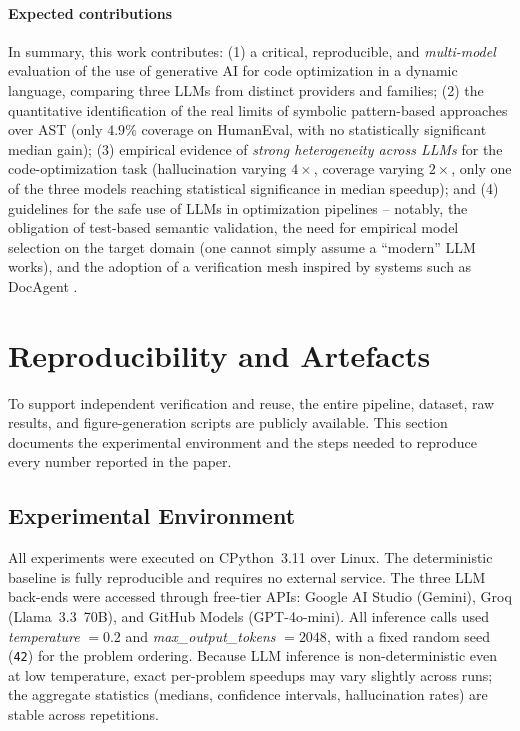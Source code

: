 \documentclass[conference]{IEEEtran}
\begin{document}
\paragraph{Expected contributions} In summary, this work contributes: (1) a critical, reproducible, and \emph{multi-model} evaluation of the use of generative AI for code optimization in a dynamic language, comparing three LLMs from distinct providers and families; (2) the quantitative identification of the real limits of symbolic pattern-based approaches over AST (only $4.9\%$ coverage on HumanEval, with no statistically significant median gain); (3) empirical evidence of \emph{strong heterogeneity across LLMs} for the code-optimization task (hallucination varying $4\times$, coverage varying $2\times$, only one of the three models reaching statistical significance in median speedup); and (4) guidelines for the safe use of LLMs in optimization pipelines -- notably, the obligation of test-based semantic validation, the need for empirical model selection on the target domain (one cannot simply assume a ``modern'' LLM works), and the adoption of a verification mesh inspired by systems such as DocAgent \cite{DBLP:journals/corr/abs-2504-08725}.

\section{Reproducibility and Artefacts}
\label{sec:reproducibility}

To support independent verification and reuse, the entire pipeline, dataset, raw results, and figure-generation scripts are publicly available. This section documents the experimental environment and the steps needed to reproduce every number reported in the paper.

\subsection{Experimental Environment}
All experiments were executed on CPython~3.11 over Linux. The deterministic baseline is fully reproducible and requires no external service. The three LLM back-ends were accessed through free-tier APIs: Google AI Studio (Gemini), Groq (Llama~3.3~70B), and GitHub Models (GPT-4o-mini). All inference calls used \textit{temperature} $= 0.2$ and \textit{max\_output\_tokens} $= 2048$, with a fixed random seed (\texttt{42}) for the problem ordering. Because LLM inference is non-deterministic even at low temperature, exact per-problem speedups may vary slightly across runs; the aggregate statistics (medians, confidence intervals, hallucination rates) are stable across repetitions.
\end{document}
